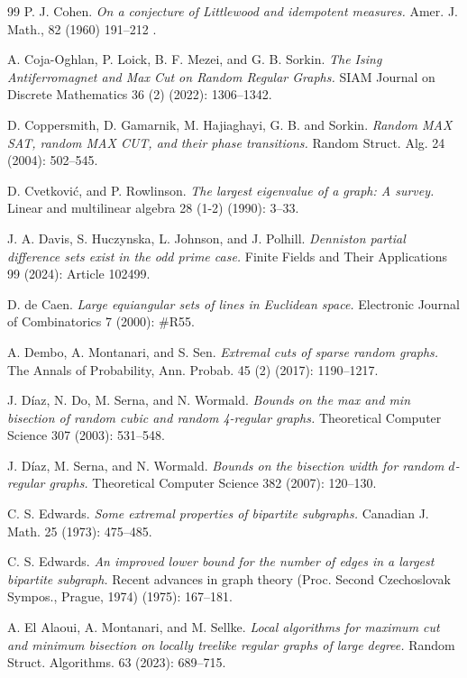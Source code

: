 \documentclass[11pt]{article}
\theoremstyle{plain}
\theoremstyle{definition}
\begin{document}
\begin{thebibliography}{99}
P. J. Cohen. 
\emph{On a conjecture of Littlewood and idempotent measures.} 
Amer. J. Math., 82 (1960) 191--212 .

 A. Coja-Oghlan, P. Loick, B. F. Mezei, and G. B. Sorkin.
\emph{The Ising Antiferromagnet and Max Cut on Random Regular Graphs.}
SIAM Journal on Discrete Mathematics 36 (2) (2022): 1306--1342.

D. Coppersmith, D. Gamarnik, M. Hajiaghayi, G. B. and Sorkin. 
\emph{Random MAX SAT, random MAX CUT, and their phase transitions.}
Random Struct. Alg. 24 (2004): 502--545.

D. Cvetkovi\'c, and P. Rowlinson.
\emph{The largest eigenvalue of a graph: A survey.}
Linear and multilinear algebra 28 (1-2) (1990): 3--33.

J. A. Davis, S. Huczynska, L. Johnson, and J. Polhill.
\emph{Denniston partial difference sets exist in the odd prime case.}
Finite Fields and Their Applications 99 (2024): Article 102499.

D. de Caen.
\emph{Large equiangular sets of lines in Euclidean space.}
Electronic Journal of Combinatorics 7 (2000): \#R55.

A. Dembo, A. Montanari, and S. Sen.
\emph{Extremal cuts of sparse random graphs.}
The Annals of Probability, Ann. Probab. 45 (2) (2017): 1190--1217.

 J. D\'iaz, N. Do, M. Serna, and N. Wormald.
 \emph{Bounds on the max and min bisection of random cubic and random 4-regular graphs.}
 Theoretical Computer Science 307 (2003): 531--548.

 J. D\'iaz, M. Serna, and N. Wormald.
 \emph{Bounds on the bisection width for random $d$-regular graphs.}
Theoretical Computer Science 382 (2007): 120--130.

C. S. Edwards.
\emph{Some extremal properties of bipartite subgraphs.}
Canadian J. Math. 25 (1973): 475--485.
		
C. S. Edwards.
\emph{An improved lower bound for the number of edges in a largest bipartite subgraph.}
Recent advances in graph theory (Proc. Second Czechoslovak Sympos., Prague, 1974) (1975): 167--181.

A. El Alaoui, A. Montanari, and M. Sellke.
\emph{Local algorithms for maximum cut and minimum bisection on locally treelike regular graphs of large degree.}
Random Struct. Algorithms. 63 (2023): 689--715.


\end{thebibliography}
\end{document}
